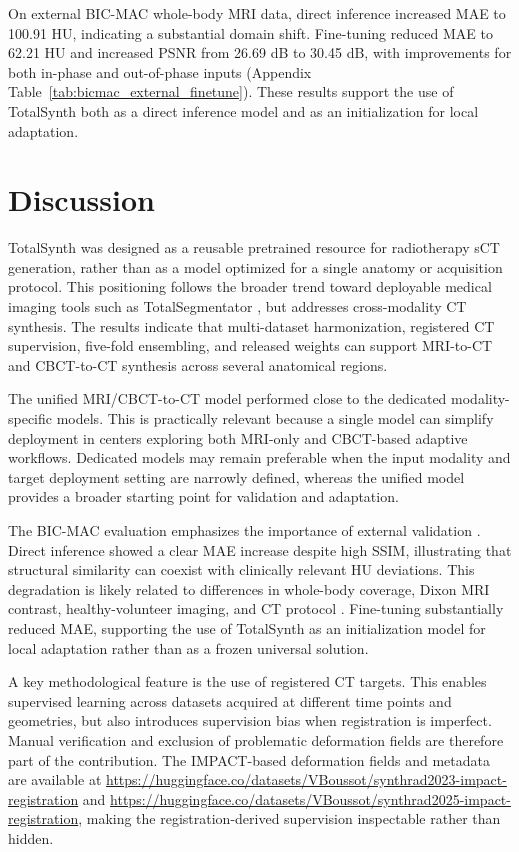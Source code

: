 \documentclass{article}
\begin{document}
On external BIC-MAC whole-body MRI data, direct inference increased MAE to 100.91 HU, indicating a substantial domain shift. Fine-tuning reduced MAE to 62.21 HU and increased PSNR from 26.69 dB to 30.45 dB, with improvements for both in-phase and out-of-phase inputs (Appendix Table~\ref{tab:bicmac_external_finetune}). These results support the use of TotalSynth both as a direct inference model and as an initialization for local adaptation.


\section{Discussion}

TotalSynth was designed as a reusable pretrained resource for radiotherapy sCT generation, rather than as a model optimized for a single anatomy or acquisition protocol. This positioning follows the broader trend toward deployable medical imaging tools such as TotalSegmentator \cite{wasserthal2023totalsegmentator}, but addresses cross-modality CT synthesis. The results indicate that multi-dataset harmonization, registered CT supervision, five-fold ensembling, and released weights can support MRI-to-CT and CBCT-to-CT synthesis across several anatomical regions.

The unified MRI/CBCT-to-CT model performed close to the dedicated modality-specific models. This is practically relevant because a single model can simplify deployment in centers exploring both MRI-only and CBCT-based adaptive workflows. Dedicated models may remain preferable when the input modality and target deployment setting are narrowly defined, whereas the unified model provides a broader starting point for validation and adaptation.

The BIC-MAC evaluation emphasizes the importance of external validation \cite{yu2022external}. Direct inference showed a clear MAE increase despite high SSIM, illustrating that structural similarity can coexist with clinically relevant HU deviations. This degradation is likely related to differences in whole-body coverage, Dixon MRI contrast, healthy-volunteer imaging, and CT protocol \cite{guan2021domain,guo2026impact}. Fine-tuning substantially reduced MAE, supporting the use of TotalSynth as an initialization model for local adaptation rather than as a frozen universal solution.

A key methodological feature is the use of registered CT targets. This enables supervised learning across datasets acquired at different time points and geometries, but also introduces supervision bias when registration is imperfect. Manual verification and exclusion of problematic deformation fields are therefore part of the contribution. The IMPACT-based deformation fields and metadata are available at \url{https://huggingface.co/datasets/VBoussot/synthrad2023-impact-registration} and \url{https://huggingface.co/datasets/VBoussot/synthrad2025-impact-registration}, making the registration-derived supervision inspectable rather than hidden.
\end{document}
